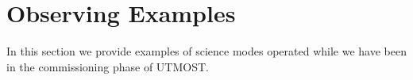 \section{Observing Examples}

In this section we provide examples of science modes operated while we have been in the commissioning phase of UTMOST.


  